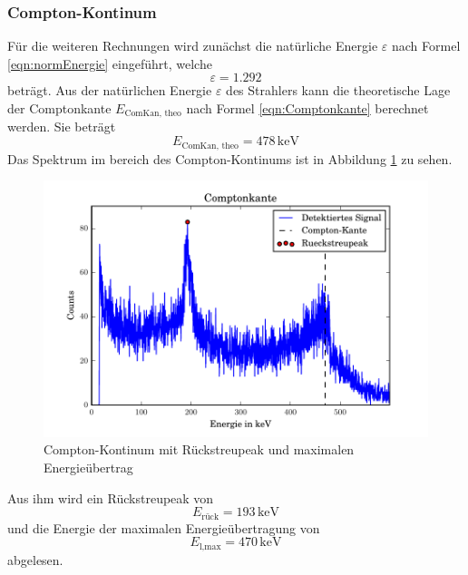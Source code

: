 \subsubsection{Compton-Kontinum}
Für die weiteren Rechnungen wird zunächst die natürliche Energie $\varepsilon$ nach Formel \ref{eqn:normEnergie} eingeführt, welche
\begin{equation}
  \varepsilon = 1.292
  \label{eqn:nE}
\end{equation}
beträgt. Aus der natürlichen Energie $\varepsilon$ des Strahlers kann die theoretische Lage der Comptonkante $E_\text{ComKan, theo}$ nach Formel \ref{eqn:Comptonkante} berechnet werden. Sie beträgt
\begin{equation}
  E_\text{ComKan, theo} = 478 \, \text{keV}
  \label{eqn:KanTheo}
\end{equation}
Das Spektrum im bereich des Compton-Kontinums ist in Abbildung \ref{fig:Compt} zu sehen.

\begin{figure}[htpb]
  \centering
  \includegraphics[width=\textwidth]{./build/Compton.pdf}
  \caption{Compton-Kontinum mit Rückstreupeak und maximalen Energieübertrag}
  \label{fig:Compt}
\end{figure}

Aus ihm wird ein Rückstreupeak von
\begin{equation}
  E_\text{rück} = 193 \, \text{keV}
  \label{eqn:KanExp}
\end{equation}
und die Energie der maximalen Energieübertragung von
\begin{equation}
  E_\text{l,max} = 470 \, \text{keV}
  \label{eqn:RückExp}
\end{equation}
abgelesen.


